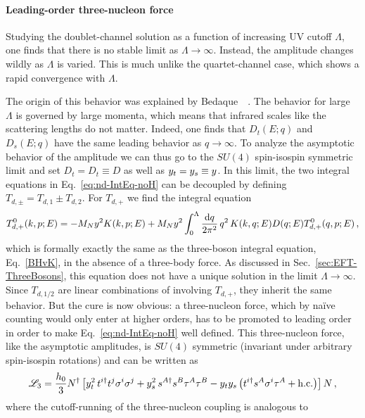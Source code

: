 \paragraph{Leading-order three-nucleon force}

Studying the doublet-channel solution as a function of increasing UV cutoff 
$\Lambda$, one finds that there is no stable limit as $\Lambda\to\infty$.  
Instead, the amplitude changes wildly as $\Lambda$ is varied.  This is much 
unlike the quartet-channel case, which shows a rapid convergence with $\Lambda$.

The origin of this behavior was explained by 
Bedaque~\etal~\cite{Bedaque:1999ve}.  The behavior for large $\Lambda$ is 
governed by large momenta, which means that infrared scales like the scattering 
lengths do not matter.  Indeed, one finds that $D_t(E;q)$ and $D_s(E;q)$ have 
the same leading behavior as $q\to\infty$.  To analyze the asymptotic behavior 
of the amplitude we can thus go to the $SU(4)$ spin-isospin symmetric limit and 
set $D_t = D_t \equiv D$ as well as $y_t = y_s \equiv y$.  In this limit, the 
two integral equations in Eq.~\eqref{eq:nd-IntEq-noH} can be decoupled by 
defining $T_{d,\pm} = T_{d,1} \pm T_{d,2}$.  For $T_{d,+}$ we find the integral 
equation
%
\begin{equation}
 T_{d,+}^0(k,p;E) = {-}M_Ny^2 K(k,p;E)
 + M_Ny^2 \int_0^\Lambda \frac{\mathrm{d} q}{2\pi^2}
 \, q^2 \, K(k,q;E) D(q;E) T_{d,+}^0(q,p;E) \,,
\end{equation}
%
which is formally exactly the same as the three-boson integral equation, 
Eq.~\eqref{BHvK}, in the absence of a three-body force.  As discussed in 
Sec.~\ref{sec:EFT-ThreeBosons}, this equation does not have a unique solution 
in the limit $\Lambda\to\infty$.  Since $T_{d,1/2}$ are linear combinations of 
involving $T_{d,+}$, they inherit the same behavior.  But the cure is now 
obvious: a three-nucleon force, which by naïve counting would only enter at 
higher orders, has to be promoted to leading order in order to make 
Eq.~\eqref{eq:nd-IntEq-noH} well defined.  This three-nucleon force, like the 
asymptotic amplitudes, is $SU(4)$ symmetric (invariant under arbitrary 
spin-isospin rotations) and can be written as
%
\begin{equation}
 \mathcal{L}_3 = \frac{h_0}{3}N^\dagger\left[\yt^2\,
 t^{i\dagger} t^j \sigma^i \sigma^j+\ys^2\,s^{A\dagger} s^B \tau^A\tau^B
 - \yt\ys\left(t^{i\dagger} s^A \sigma^i \tau^A + \hc\right) \right]N \,,
\label{eq:L-3}
\end{equation}
%
where the cutoff-running of the three-nucleon coupling is analogous to 
